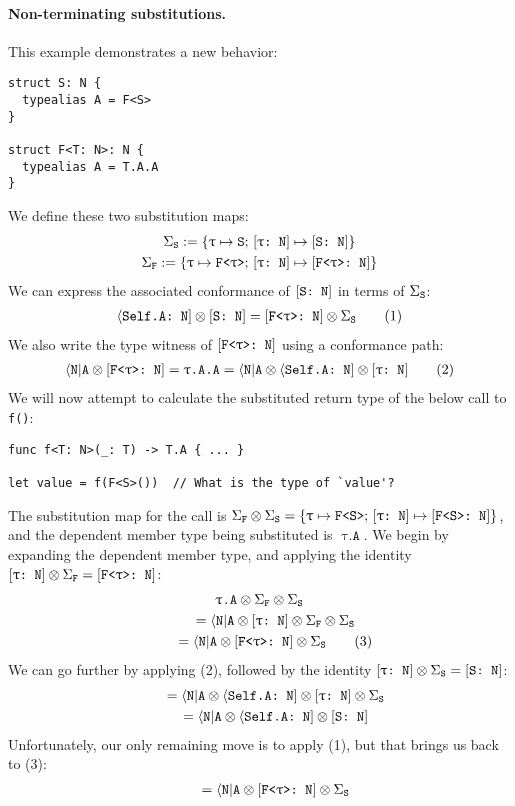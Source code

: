\documentclass[../generics]{subfiles}
\begin{document}
\paragraph{Non-terminating substitutions.}
This example demonstrates a new behavior:
\begin{Verbatim}
struct S: N {
  typealias A = F<S>
}

struct F<T: N>: N {
  typealias A = T.A.A
}
\end{Verbatim}
We define these two substitution maps:
\begin{gather*} \Sigma_\texttt{S}:=\{\texttt{$\uptau$} \mapsto \texttt{S};\,[\texttt{$\uptau$:~N}] \mapsto [\texttt{S:~N}]\}\\
\Sigma_\texttt{F} := \{\texttt{$\uptau$} \mapsto \texttt{F<$\uptau$>};\,[\texttt{$\uptau$:~N}] \mapsto [\texttt{F<$\uptau$>:~N}]\}
\end{gather*}
We can express the associated conformance of $[\texttt{S:~N}]$ in terms of $\Sigma_\texttt{S}$:
\begin{gather*}
\langle\texttt{Self.A:~N}] \otimes [\texttt{S:~N}] = [\texttt{F<$\uptau$>:~N}]\otimes \Sigma_\texttt{S} \tag{1}
\end{gather*}
We also write the type witness of $[\texttt{F<$\uptau$>:~N}]$ using a conformance path:
\begin{gather*}
\langle\texttt{N}|\texttt{A} \otimes [\texttt{F<$\uptau$>:~N}] = \texttt{$\uptau$.A.A} = \langle\texttt{N}|\texttt{A} \otimes \langle\texttt{Self.A:~N}] \otimes [\texttt{$\uptau$:~N}] \tag{2}
\end{gather*}
We will now attempt to calculate the substituted return type of the below call to \verb|f()|:
\begin{Verbatim}
func f<T: N>(_: T) -> T.A { ... }

let value = f(F<S>())  // What is the type of `value'?
\end{Verbatim}
The substitution map for the call is $\Sigma_\texttt{F} \otimes \Sigma_\texttt{S} = \{\texttt{$\uptau$} \mapsto \texttt{F<S>};\,[\texttt{$\uptau$:~N}] \mapsto [\texttt{F<S>:~N}]\}$, and the dependent member type being substituted is $\texttt{$\uptau$.A}$. We begin by expanding the dependent member type, and applying the identity $[\texttt{$\uptau$:~N}] \otimes \Sigma_\texttt{F} = [\texttt{F<$\uptau$>:~N}]$:
\begin{gather*}
\texttt{$\uptau$.A} \otimes \Sigma_\texttt{F}\otimes\Sigma_\texttt{S} \\
\qquad {} = \langle\texttt{N}|\texttt{A} \otimes [\texttt{$\uptau$:~N}] \otimes \Sigma_\texttt{F}\otimes\Sigma_\texttt{S}\\
\qquad {} = \langle\texttt{N}|\texttt{A} \otimes [\texttt{F<$\uptau$>:~N}] \otimes \Sigma_\texttt{S} \tag{3}
\end{gather*}
We can go further by applying (2), followed by the identity $[\texttt{$\uptau$:~N}] \otimes \Sigma_\texttt{S}=[\texttt{S:~N}]$:
\begin{gather*}
\qquad {} = \langle\texttt{N}|\texttt{A} \otimes \langle\texttt{Self.A:~N}] \otimes [\texttt{$\uptau$:~N}] \otimes \Sigma_\texttt{S}\\
\qquad {} = \langle\texttt{N}|\texttt{A} \otimes \langle\texttt{Self.A:~N}] \otimes [\texttt{S:~N}]
\end{gather*}
Unfortunately, our only remaining move is to apply (1), but that brings us back to (3):
\begin{gather*}
\qquad {} = \langle\texttt{N}|\texttt{A} \otimes [\texttt{F<$\uptau$>:~N}] \otimes \Sigma_\texttt{S}
\end{gather*}
\end{document}
